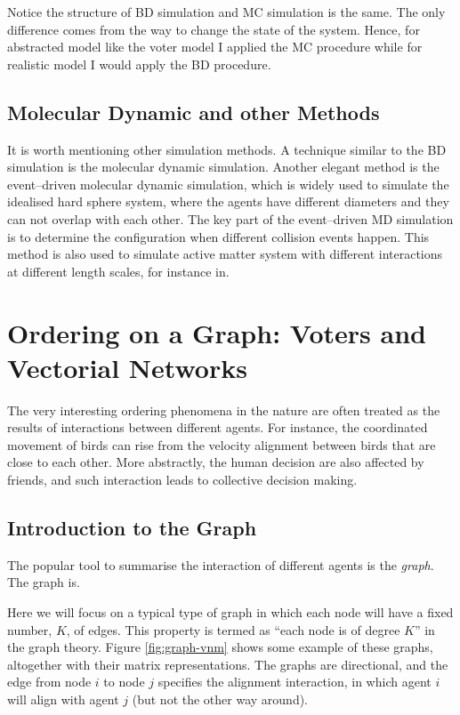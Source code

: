 \documentclass[11pt,twoside]{report}
\begin{document}
Notice the structure of BD simulation and MC simulation is the same. The only difference comes from the way to change the state of the system. Hence, for abstracted model like the voter model I applied the MC procedure while for realistic model I would apply the BD procedure.

\subsection{Molecular Dynamic and other Methods}

It is worth mentioning other simulation methods. A technique similar to the BD simulation is the molecular dynamic simulation. %
Another elegant method is the event--driven molecular dynamic simulation, which is widely used to simulate the idealised hard sphere system, where the agents have different diameters and they can not overlap with each other. The key part of the event--driven MD simulation is to determine the configuration when different collision events happen. This method is also used to simulate active matter system with different interactions at different length scales, for instance in.

\section{Ordering on a Graph: Voters and Vectorial Networks}


The very interesting ordering phenomena in the nature are often treated as the results of interactions between different agents. For instance, the coordinated movement of birds can rise from the velocity alignment between birds that are close to each other. More abstractly, the human decision are also affected by friends, and such interaction leads to collective decision making.

\subsection{Introduction to the Graph}

The popular tool to summarise the interaction of different agents is the \emph{graph}. The graph is.

Here we will focus on a typical type of graph in which each node will have a fixed number, $K$, of edges. This property is termed as ``each node is of degree $K$'' in the graph theory. Figure \ref{fig:graph-vnm} shows some example of these graphs, altogether with their matrix representations. The graphs are directional, and the edge from node $i$ to node $j$ specifies the alignment interaction, in which agent $i$ will align with agent $j$ (but not the other way around).
\end{document}
